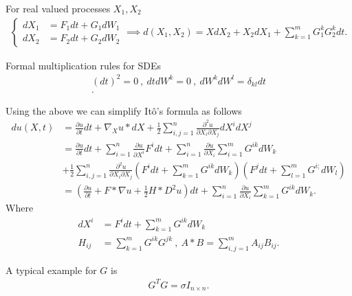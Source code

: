 \begin{prop}
  For real valued processes $X_{1},X_{2}$
 \begin{align*}
  \begin{cases}
    dX_{1} &= F_{1} dt + G_1 dW_1 \\
    d X_2 &= F_{2} dt + G_{2} dW_2
  \end{cases} \implies d(X_{1},X_{2}) = XdX_{2} + X_{2}dX_{1} + \sum_{k=1}^{m} G_1^{k} G_2^{k} dt   
 .\end{align*} 
\end{prop}
\begin{definition}
 Formal multiplication rules for SDEs
 \begin{align*}
   (dt)^2 = 0 \ , \ dt dW^{k} = 0 \ , \ dW^{k}dW^{l} = \delta_{kl} dt \\
 .\end{align*}
\end{definition}
\newpage
\begin{remark}
  Using the above we can simplify It\^o's formula as follows 
\begin{align*}
  du(X,t) &= \frac{\partial u}{\partial t} dt + \nabla_X u*dX + \frac{1}{2}\sum_{i,j=1}^{n} \frac{\partial ^2  u}{\partial X_i \partial X_j}   dX^{i}dX^{j}   \\ 
          &= \frac{\partial u}{\partial t} dt + \sum_{i=1}^{n} \frac{\partial u}{\partial X^{i} } F^{i} dt + \sum_{i=1}^{n} \frac{\partial u }{\partial X_i}      \sum_{i=1}^{m} G^{ik} d W_k   \\
          &+  \frac{1}{2} \sum_{i,j=1}^{n}  \frac{\partial ^2  u}{\partial X_i \partial X_j} \left(F^{i} dt + \sum_{k=1}^{m} G^{ik} dW_k   \right)\left( F^{j} dt + \sum_{l=1}^{m} G^{i;} dW_l    \right)   \\
          &= (\frac{\partial u}{\partial t} + F*\nabla u + \frac{1}{2} H*D^2 u) dt + \sum_{i=1}^{n} \frac{\partial u}{\partial X_i} \sum_{k=1}^{m} G^{ik} dW_{k}
.\end{align*}
Where 
\begin{align*}
  dX^{i} &= F^{i} dt + \sum_{k=1}^{m}  G^{ik} dW_k   \\
  H_{ij} &= \sum_{k=1}^{m} G^{ik}G^{jk}  \ , \ A *B = \sum_{i,j=1}^{m} A_{ij} B_{ij} 
.\end{align*}
\end{remark}
\begin{example}
 A typical example for $G$ is  
  \begin{align*}
      G^{T}G = \sigma  I_{n \times  n} 
  .\end{align*}
\end{example}
